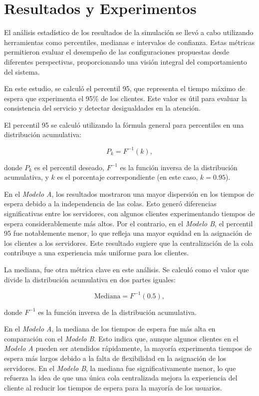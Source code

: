 \documentclass[a4paper,12pt]{article}
\begin{document}
\section{Resultados y Experimentos}
El análisis estadístico de los resultados de la simulación se llevó a cabo utilizando herramientas como percentiles, medianas e intervalos de confianza. Estas métricas permitieron evaluar el desempeño de las configuraciones propuestas desde diferentes perspectivas, proporcionando una visión integral del comportamiento del sistema.

En este estudio, se calculó el percentil 95, que representa el tiempo máximo de espera que experimenta el 95\% de los clientes. Este valor es útil para evaluar la consistencia del servicio y detectar desigualdades en la atención.

El percentil 95 se calculó utilizando la fórmula general para percentiles en una distribución acumulativa:

\[
P_k = F^{-1}(k),
\]

donde \( P_k \) es el percentil deseado, \( F^{-1} \) es la función inversa de la distribución acumulativa, y \( k \) es el porcentaje correspondiente (en este caso, \( k = 0.95 \)).

En el \textit{Modelo A}, los resultados mostraron una mayor dispersión en los tiempos de espera debido a la independencia de las colas. Esto generó diferencias significativas entre los servidores, con algunos clientes experimentando tiempos de espera considerablemente más altos. Por el contrario, en el \textit{Modelo B}, el percentil 95 fue notablemente menor, lo que refleja una mayor equidad en la asignación de los clientes a los servidores. Este resultado sugiere que la centralización de la cola contribuye a una experiencia más uniforme para los clientes.

La mediana, fue otra métrica clave en este análisis. Se calculó como el valor que divide la distribución acumulativa en dos partes iguales:

\[
\text{Mediana} = F^{-1}(0.5),
\]

donde \( F^{-1} \) es la función inversa de la distribución acumulativa.

En el \textit{Modelo A}, la mediana de los tiempos de espera fue más alta en comparación con el \textit{Modelo B}. Esto indica que, aunque algunos clientes en el \textit{Modelo A} pueden ser atendidos rápidamente, la mayoría experimenta tiempos de espera más largos debido a la falta de flexibilidad en la asignación de los servidores. En el \textit{Modelo B}, la mediana fue significativamente menor, lo que refuerza la idea de que una única cola centralizada mejora la experiencia del cliente al reducir los tiempos de espera para la mayoría de los usuarios.
\end{document}
